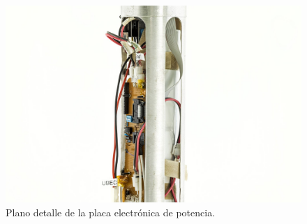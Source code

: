\begin{figure}[htb]
    \centering
    \includegraphics[width=\linewidth]{fig/hq/backpcb.jpg}
    \caption{Plano detalle de la placa electrónica de potencia.}
    \label{fig:hq/backpcb}
\end{figure}

\null\newpage
\clearpage